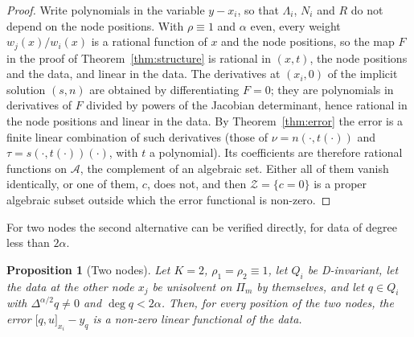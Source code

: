 \documentclass[12pt]{amsart}
\newtheorem{proposition}[theorem]{Proposition}
\theoremstyle{definition}
\theoremstyle{remark}
\newcommand{\Pm}{\Pi_m}
\newcommand{\fpz}[3]{\bigl[#1,#2\bigr]_{#3}}     %
\begin{document}
\begin{proof}
Write polynomials in the variable $y-x_i$, so that $\Lambda_i$, $N_i$ and $R$ do not depend on
the node positions. With $\rho\equiv1$ and $\alpha$ even, every weight $w_j(x)/w_i(x)$ is a
rational function of $x$ and the node positions, so the map $F$ in the proof of
Theorem~\ref{thm:structure} is rational in $(x,t)$, the node positions and the data, and linear
in the data. The derivatives at $(x_i,0)$ of the implicit solution $(s,n)$ are obtained by
differentiating $F=0$; they are polynomials in derivatives of $F$ divided by powers of the
Jacobian determinant, hence rational in the node positions and linear in the data. By
Theorem~\ref{thm:error} the error is a finite linear combination of such derivatives (those of
$\nu=n(\cdot,t(\cdot))$ and $\tau=s(\cdot,t(\cdot))(\cdot)$, with $t$ a polynomial). Its
coefficients are therefore rational functions on $\mathcal A$, the complement of an algebraic
set. Either all of them vanish identically, or one of them, $c$, does not, and then
$\mathcal Z=\{c=0\}$ is a proper algebraic subset outside which the error functional is non-zero.
\end{proof}

For two nodes the second alternative can be verified directly, for data of degree less than
$2\alpha$.

\begin{proposition}[Two nodes]\label{prop:twonodes}
Let $K=2$, $\rho_1=\rho_2\equiv1$, let $Q_i$ be D-invariant, let the data at the other node $x_j$
be unisolvent on $\Pm$ by themselves, and let $q\in Q_i$ with $\Delta^{\alpha/2}q\ne0$ and
$\deg q<2\alpha$. Then, for every position of the two nodes, the error $\fpz{q}{u}{x_i}-y_q$ is a
non-zero linear functional of the data.
\end{proposition}
\end{document}
